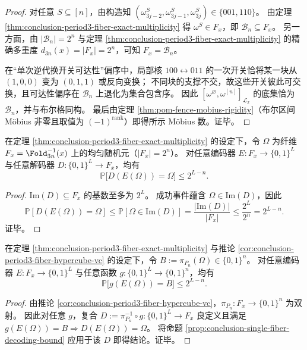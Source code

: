 \begin{proof}
对任意 \(S\subseteq[n]\)，由构造知 \((\omega^S_{3j-2},\omega^S_{3j-1},\omega^S_{3j})\in\{001,110\}\)。
由定理 \ref{thm:conclusion-period3-fiber-exact-multiplicity} 得 \(\omega^S\in F_x\)，即 \(\mathcal B_n\subseteq F_x\)。
另一方面，由 \(|\mathcal B_n|=2^n\) 与定理 \ref{thm:conclusion-period3-fiber-exact-multiplicity} 的精确多重度 \(d_{3n}(x)=|F_x|=2^n\)，可知 \(F_x=\mathcal B_n\)。

在“单次逆代换开关可达性”偏序中，局部核 \(100\leftrightarrow 011\) 的一次开关恰将某一块从 \((1,0,0)\) 变为 \((0,1,1)\) 或反向变换；
不同块的支撑不交，故这些开关彼此可交换，且可达性偏序在 \(\mathcal B_n\) 上退化为集合包含序。
因此 \([\omega^{\varnothing},\omega^{[n]}]_{\mathcal L_x}\) 的底集恰为 \(\mathcal B_n\)，并与布尔格同构。
最后由定理 \ref{thm:pom-fence-mobius-rigidity}（布尔区间 Möbius 非零且取值为 \((-1)^{\mathrm{rank}}\)）即得所示 Möbius 数。证毕。
\end{proof}

\begin{proposition}[单纤维均匀分布下的微观恢复上界]\label{prop:conclusion-single-fiber-decoding-bound}
在定理 \ref{thm:conclusion-period3-fiber-exact-multiplicity} 的设定下，令 \(\Omega\) 为纤维 \(F_x=\Fold_{3n}^{-1}(x)\) 上的均匀随机元（\(|F_x|=2^n\)）。
对任意编码器 \(E:F_x\to\{0,1\}^L\) 与任意解码器 \(D:\{0,1\}^L\to F_x\)，均有
\[
\mathbb{P}\bigl[D(E(\Omega))=\Omega\bigr]\le 2^{L-n}.
\]
\end{proposition}

\begin{proof}
\(\mathrm{Im}(D)\subseteq F_x\) 的基数至多为 \(2^L\)。
成功事件蕴含 \(\Omega\in\mathrm{Im}(D)\)，因此
\[
\mathbb{P}[D(E(\Omega))=\Omega]\le \mathbb{P}[\Omega\in\mathrm{Im}(D)]
  =\frac{|\mathrm{Im}(D)|}{|F_x|}
  \le \frac{2^L}{2^n}=2^{L-n}.
\]
证毕。
\end{proof}

\begin{corollary}[周期纤维的微观证据提取上界]\label{cor:conclusion-single-fiber-assignment-extraction-bound}
在定理 \ref{thm:conclusion-period3-fiber-exact-multiplicity} 与推论 \ref{cor:conclusion-period3-fiber-hypercube-vc} 的设定下，令
\(
B:=\pi_{P_n}(\Omega)\in\{0,1\}^n
\)。
对任意编码器 \(E:F_x\to\{0,1\}^L\) 与任意函数 \(g:\{0,1\}^L\to\{0,1\}^n\)，均有
\[
\mathbb{P}\bigl[g(E(\Omega))=B\bigr]\le 2^{L-n}.
\]
\end{corollary}

\begin{proof}
由推论 \ref{cor:conclusion-period3-fiber-hypercube-vc}，\(\pi_{P_n}:F_x\to\{0,1\}^n\) 为双射。
因此对任意 \(g\)，复合 \(D:=\pi_{P_n}^{-1}\circ g:\{0,1\}^L\to F_x\) 良定义且满足
\(
g(E(\Omega))=B \Rightarrow D(E(\Omega))=\Omega
\)。
将命题 \ref{prop:conclusion-single-fiber-decoding-bound} 应用于该 \(D\) 即得结论。证毕。
\end{proof}

